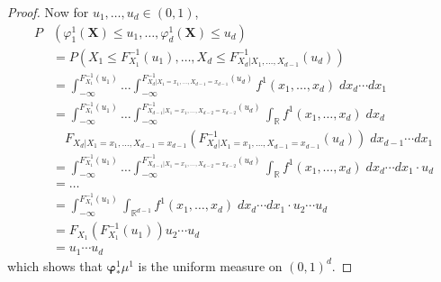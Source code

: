 \documentclass[10pt,a4paper]{amsart}
\newcommand{\R}{\mathbb R}
\newcommand{\inv}{^{-1}}
\begin{document}
\begin{proof}
    Now for $u_1,\dots,u_d\in(0,1)$,
    \begin{align*}
        P&(\varphi_1^1(\bm X) \leq u_1,\dots,\varphi_d^1(\bm X) \leq u_d) \\
        &= P\left(X_1\leq F\inv_{X_1}(u_1),\dots,X_d\leq F\inv_{X_d|X_1,\dots,X_{d-1}}(u_d)\right) \\
        &= \int_{-\infty}^{F\inv_{X_1}(u_1)}\dots\int_{-\infty}^{F\inv_{X_d|X_1=x_1,\dots,X_{d-1}=x_{d-1}}(u_d)}f^1(x_1,\dots,x_d)\;dx_d\cdots dx_1 \\
        &= \int_{-\infty}^{F\inv_{X_1}(u_1)}\dots\int_{-\infty}^{F\inv_{X_{d-1}|X_1=x_1,\dots,X_{d-2}=x_{d-2}}(u_d)}\int_\R f^1(x_1,\dots,x_d)\;dx_d\\
        &\quad F_{X_d|X_1=x_1,\dots, X_{d-1}=x_{d-1}}\left(F\inv_{X_d|X_1=x_1,\dots, X_{d-1}=x_{d-1}}(u_d)\right)\;dx_{d-1} \cdots dx_1 \\
        &= \int_{-\infty}^{F\inv_{X_1}(u_1)}\dots\int_{-\infty}^{F\inv_{X_{d-1}|X_1=x_1,\dots,X_{d-2}=x_{d-2}}(u_d)}\int_\R f^1(x_1,\dots,x_d)\;dx_d\cdots dx_1 \cdot u_d \\
        &= \dots \\
        &= \int_{-\infty}^{F_{X_1}\inv(u_1)}\int_{\R^{d-1}}f^1(x_1,\dots,x_d)\;dx_d\cdots dx_1 \cdot u_2\cdots u_d \\
        &= F_{X_1}\left(F_{X_1}\inv(u_1)\right)u_2\cdots u_d \\
        &= u_1\cdots u_d
    \end{align*}
    which shows that $\bm\varphi^1_*\mu^1$ is the uniform measure on $(0,1)^d$.
\end{proof}
\end{document}
